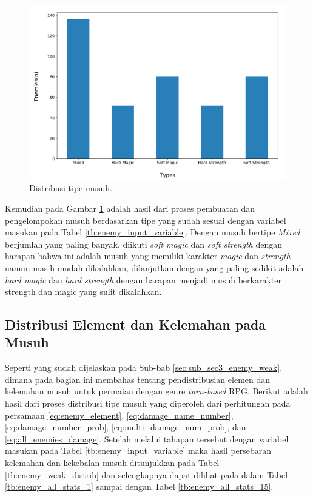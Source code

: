 \begin{figure} [!h] \centering
	\includegraphics[scale=0.5]{img/EnemyTypeDistrib.png}
	\caption{Distribusi tipe musuh.}
	\label{fig:enemy_type_distrib}
\end{figure}

Kemudian pada Gambar \ref{fig:enemy_type_distrib} adalah hasil dari proses pembuatan dan pengelompokan musuh berdasarkan tipe yang sudah sesuai dengan variabel masukan pada Tabel \ref{tb:enemy_input_variable}. Dengan musuh bertipe \textit{Mixed} berjumlah yang paling banyak, diikuti \textit{soft magic} dan \textit{soft strength} dengan harapan bahwa ini adalah musuh yang memiliki karakter \textit{magic} dan \textit{strength} namun masih mudah dikalahkan, dilanjutkan dengan yang paling sedikit adalah \textit{hard magic} dan \textit{hard strength} dengan harapan menjadi musuh berkarakter strength dan magic yang sulit dikalahkan.
\vspace{1ex}

\subsection{Distribusi Element dan Kelemahan pada Musuh}
\label{sec:sub_sec4_eval_dist_enemy_element_and_weak}
\vspace{1ex}

Seperti yang sudah dijelaskan pada Sub-bab \ref{sec:sub_sec3_enemy_weak}, dimana pada bagian ini membahas tentang pendistribusian elemen dan kelemahan musuh untuk permaian dengan genre \textit{turn-based} RPG. Berikut adalah hasil dari proses distribusi tipe musuh yang diperoleh dari perhitungan pada persamaan \ref{eq:enemy_element}, \ref{eq:damage_name_number}, \ref{eq:damage_number_prob}, \ref{eq:multi_damage_num_prob}, dan \ref{eq:all_enemies_damage}. Setelah melalui tahapan tersebut dengan variabel masukan pada Tabel \ref{tb:enemy_input_variable} maka hasil persebaran kelemahan dan kekebalan musuh ditunjukkan pada Tabel \ref{tb:enemy_weak_distrib} dan selengkapnya dapat dilihat pada  dalam Tabel \ref{tb:enemy_all_stats_1} sampai dengan Tabel \ref{tb:enemy_all_stats_15}.
\vspace{-1ex}


